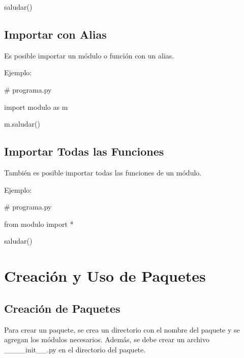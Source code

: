 \documentclass[
  a4paper,
  DIV=11,
  numbers=noendperiod,
  onepage,
  openany]{scrreprt}
\newenvironment{Shaded}{\begin{snugshade}}{\end{snugshade}}
\newcommand{\CommentTok}[1]{\textcolor[rgb]{0.37,0.37,0.37}{#1}}
\newcommand{\ImportTok}[1]{\textcolor[rgb]{0.00,0.46,0.62}{#1}}
\newcommand{\NormalTok}[1]{\textcolor[rgb]{0.00,0.23,0.31}{#1}}
\newcommand{\OperatorTok}[1]{\textcolor[rgb]{0.37,0.37,0.37}{#1}}
\begin{document}
\begin{tcolorbox}
\begin{Shaded}
\begin{Highlighting}[]
\NormalTok{saludar()}
\end{Highlighting}
\end{Shaded}

\section{Importar con Alias}\label{importar-con-alias}

Es posible importar un módulo o función con un alias.

Ejemplo:

\begin{Shaded}
\begin{Highlighting}[]
\CommentTok{\# programa.py}

\ImportTok{import}\NormalTok{ modulo }\ImportTok{as}\NormalTok{ m}

\NormalTok{m.saludar()}
\end{Highlighting}
\end{Shaded}

\section{Importar Todas las
Funciones}\label{importar-todas-las-funciones}

También es posible importar todas las funciones de un módulo.

Ejemplo:

\begin{Shaded}
\begin{Highlighting}[]
\CommentTok{\# programa.py}

\ImportTok{from}\NormalTok{ modulo }\ImportTok{import} \OperatorTok{*}

\NormalTok{saludar()}
\end{Highlighting}
\end{Shaded}

\chapter{Creación y Uso de
Paquetes}\label{creaciuxf3n-y-uso-de-paquetes}

\section{Creación de Paquetes}\label{creaciuxf3n-de-paquetes}

Para crear un paquete, se crea un directorio con el nombre del paquete y
se agregan los módulos necesarios. Además, se debe crear un archivo
\_\_\_\_init\_\_.py en el directorio del paquete.


\end{tcolorbox}
\end{document}

